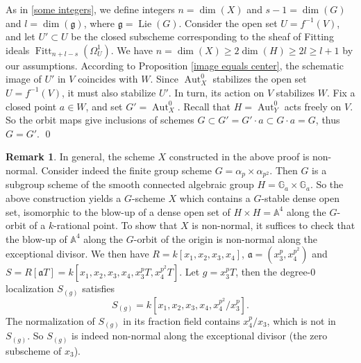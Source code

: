 \documentclass[oneside, 12pt]{amsart}
\theoremstyle{definition}
\newtheorem{remark}[theorem]{Remark}
\theoremstyle{remark}
\renewcommand{\AA}{\mathbb{A}}
\newcommand{\GG}{\mathbb{G}}
\newcommand{\ideala}{\mathfrak{a}}
\newcommand{\Aut}{\operatorname{Aut}}
\newcommand{\Fitt}{\operatorname{Fitt}}
\newcommand{\Lie}{\operatorname{Lie}}
\newcommand{\lieg}{\mathfrak{g}}
\begin{document}
As in \eqref{some integers}, we define integers  
$n=\dim(X)$ and $s-1=\dim(G)$ 
and $l=\dim(\lieg)$, where $\lieg=\Lie(G)$.
Consider the open set $U=f^{-1}(V)$, and let $U'\subset U$ 
be the closed subscheme corresponding 
to the sheaf of Fitting ideals $\Fitt_{n+ l-s}(\Omega^1_U)$. 
We have $n=\dim(X) \geq  2\dim(H)\geq 2l \geq l+1$ by our assumptions.
According to Proposition \ref{image equals center}, 
the schematic image of $U'$ in $V$ coincides with $W$.
Since $\Aut^0_X$ stabilizes the open set $U=f^{-1}(V)$, it must also stabilize $U'$.
In turn, its action on $V$ stabilizes $W$. 
Fix a closed point $a\in W$, and set $G'=\Aut_X^0$.
Recall that $H=\Aut_Y^0$ acts freely on $V$. 
So the orbit maps give inclusions of schemes 
$G\subset G'=G'\cdot a\subset G\cdot a=G$, thus $G=G'$.
\qed


\begin{remark}
\label{rem:nonnormal}
In general, the scheme $X$ constructed in the above proof 
is non-normal. Consider indeed the finite group scheme
$G = \alpha_p \times \alpha_{p^2}$. Then
$G$ is a subgroup scheme of the smooth connected algebraic 
group $H = \GG_a \times \GG_a$. So the above construction 
yields a $G$-scheme $X$ which contains a $G$-stable dense 
open set, isomorphic to the blow-up of 
a dense open set of $H \times H = \AA^4$ along the 
$G$-orbit of a $k$-rational point. To show that $X$ is
non-normal, it suffices to check that the blow-up of
$\AA^4$ along the $G$-orbit of the origin is non-normal
along the exceptional divisor. We then have
$R = k[x_1,x_2,x_3,x_4]$, 
$\ideala = (x_3^p, x_4^{p^2})$ and
$S = R[\ideala T] 
= k[x_1,x_2,x_3,x_4, x_3^p T, x_4^{p^2} T]$.
Let $g = x_3^p T$, then the degree-$0$ localization
$S_{(g)}$ satisfies
\[ S_{(g)} = k[x_1,x_2,x_3,x_4,x_4^{p^2}/x_3^p]. \]
The normalization of $S_{(g)}$ in its fraction field contains 
$x_4^p/x_3$, which is not in $S_{(g)}$. So $S_{(g)}$
is indeed non-normal along the exceptional divisor
(the zero subscheme of $x_3$).
\end{remark}
\end{document}
